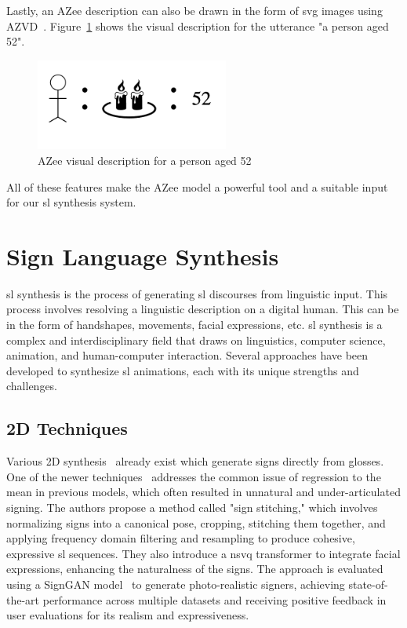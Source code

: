 \documentclass[../../main.tex]{subfiles}
\begin{document}
Lastly, an AZee description can also be drawn in the form of \gls{svg} images using AZVD~\cite{filhol2024software}. Figure~\ref{fig:azvd} shows the visual description for the \gls{utterance} "a person aged 52".

\begin{figure}
  \centering \includegraphics[width = 2.5in]{chapters/background_work/images/azvd.png}
  \caption{AZee visual description for a person aged 52}
  \label{fig:azvd}
\end{figure}

All of these features make the AZee model a powerful tool and a suitable input for our \gls{sl} synthesis system.

\section{Sign Language Synthesis}
\label{ch:background_work:sign_language_synthesis}

\gls{sl} synthesis is the process of generating \gls{sl} discourses from linguistic input. This process involves resolving a linguistic description on a digital human. This can be in the form of handshapes, movements, facial expressions, etc. \gls{sl} synthesis is a complex and interdisciplinary field that draws on linguistics, computer science, animation, and human-computer interaction. Several approaches have been developed to synthesize \gls{sl} animations, each with its unique strengths and challenges.

\subsection{2D Techniques}
\label{ch:background_work:sign_language_synthesis:2d_techniques}

Various 2D synthesis~\cite{jiang2024signclipconnectingtextsign, moryossef2024signmtrealtimemultilingualsign} already exist which generate signs directly from \gls{glosses}. One of the newer techniques~\cite{walsh2024sign} addresses the common issue of regression to the mean in previous models, which often resulted in unnatural and under-articulated signing. The authors propose a method called "sign stitching," which involves normalizing signs into a canonical pose, cropping, stitching them together, and applying frequency domain filtering and resampling to produce cohesive, expressive \gls{sl} sequences. They also introduce a \gls{nsvq} transformer to integrate facial expressions, enhancing the naturalness of the signs. The approach is evaluated using a SignGAN model~\cite{saunders2020everybodysignnowtranslating} to generate photo-realistic signers, achieving state-of-the-art performance across multiple datasets and receiving positive feedback in user evaluations for its realism and expressiveness.
\end{document}
